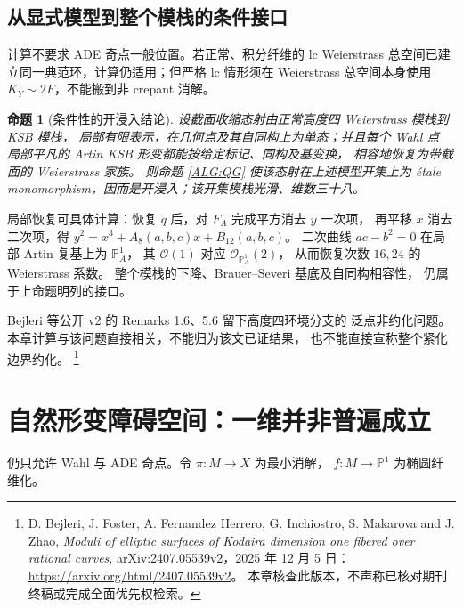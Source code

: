 \documentclass[UTF8,fontset=fandol,zihao=-4,oneside,openany]{ctexbook}
\theoremstyle{cjkplain}
\newtheorem{proposition}[theorem]{命题}
\numberwithin{equation}{chapter}
\begin{document}
\subsection{从显式模型到整个模栈的条件接口}

计算不要求 ADE 奇点一般位置。若正常、积分纤维的 lc Weierstrass
总空间已建立同一典范环，计算仍适用；但严格 lc 情形须在
Weierstrass 总空间本身使用 $K_Y\sim2F$，不能搬到非 crepant 消解。

\begin{proposition}[条件性的开浸入结论]
\label{ALG:moduliconditional}
设截面收缩态射由正常高度四 Weierstrass 模栈到 KSB 模栈，
局部有限表示，在几何点及其自同构上为单态；并且每个 Wahl 点
局部平凡的 Artin KSB 形变都能按给定标记、同构及基变换，
相容地恢复为带截面的 Weierstrass 家族。
则命题 \ref{ALG:QG} 使该态射在上述模型开集上为
étale monomorphism，因而是开浸入；该开集模栈光滑、维数三十八。
\end{proposition}

局部恢复可具体计算：恢复 $q$ 后，对 $F_A$ 完成平方消去 $y$ 一次项，
再平移 $x$ 消去二次项，得
$y^2=x^3+A_8(a,b,c)x+B_{12}(a,b,c)$。
二次曲线 $ac-b^2=0$ 在局部 Artin 复基上为 $\mathbb P^1_A$，
其 $\mathcal O(1)$ 对应 $\mathcal O_{\mathbb P^1_A}(2)$，
从而恢复次数 $16,24$ 的 Weierstrass 系数。
整个模栈的下降、Brauer--Severi 基底及自同构相容性，
仍属于上命题明列的接口。

Bejleri 等公开 v2 的 Remarks 1.6、5.6 留下高度四环境分支的
泛点非约化问题。本章计算与该问题直接相关，不能归为该文已证结果，
也不能直接宣称整个紧化边界约化。
\footnote{D. Bejleri, J. Foster, A. Fernandez Herrero, G. Inchiostro,
S. Makarova and J. Zhao,
\emph{Moduli of elliptic surfaces of Kodaira dimension one fibered over rational curves},
arXiv:2407.05539v2，2025 年 12 月 5 日：
\url{https://arxiv.org/html/2407.05539v2}。
本章核查此版本，不声称已核对期刊终稿或完成全面优先权检索。}

\section{自然形变障碍空间：一维并非普遍成立}

仍只允许 Wahl 与 ADE 奇点。令 $\pi:M\to X$ 为最小消解，
$f:M\to\mathbb P^1$ 为椭圆纤维化。
\end{document}
